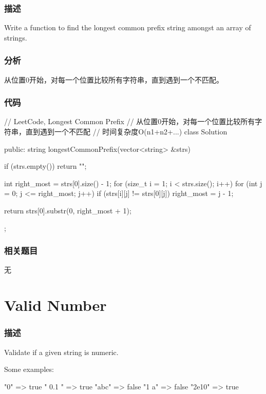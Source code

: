 \subsubsection{描述}
Write a function to find the longest common prefix string amongst an array of strings.


\subsubsection{分析}
从位置0开始，对每一个位置比较所有字符串，直到遇到一个不匹配。


\subsubsection{代码}
\begin{Code}
// LeetCode, Longest Common Prefix
// 从位置0开始，对每一个位置比较所有字符串，直到遇到一个不匹配
// 时间复杂度O(n1+n2+...)
class Solution {
public:
    string longestCommonPrefix(vector<string> &strs) {
        if (strs.empty()) return "";

        int right_most = strs[0].size() - 1;
        for (size_t i = 1; i < strs.size(); i++)
            for (int j = 0; j <= right_most; j++)
                if (strs[i][j] != strs[0][j])
                    right_most = j - 1;

        return strs[0].substr(0, right_most + 1);
    }
};
\end{Code}


\subsubsection{相关题目}
\begindot
\item 无
\myenddot


\section{Valid Number} %
\label{sec:valid-number}


\subsubsection{描述}
Validate if a given string is numeric.

Some examples:
\begin{Code}
"0" => true
" 0.1 " => true
"abc" => false
"1 a" => false
"2e10" => true
\end{Code}

